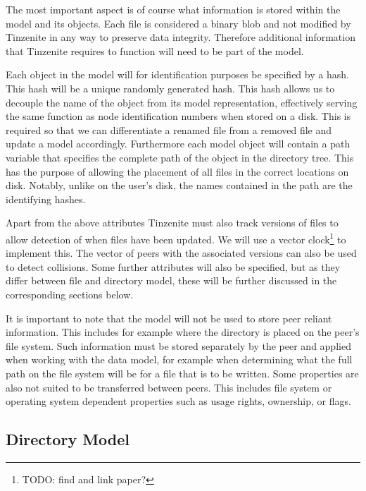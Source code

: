 The most important aspect is of course what information is stored within the model and its objects.
Each file is considered a binary blob and not modified by Tinzenite in any way to preserve data integrity.
Therefore additional information that Tinzenite requires to function will need to be part of the model.

Each object in the model will for identification purposes be specified by a hash.
This hash will be a unique randomly generated hash.
This hash allows us to decouple the name of the object from its model representation, effectively serving the same function as node identification numbers when stored on a disk.
This is required so that we can differentiate a renamed file from a removed file and update a model accordingly.
Furthermore each model object will contain a path variable that specifies the complete path of the object in the directory tree.
This has the purpose of allowing the placement of all files in the correct locations on disk.
Notably, unlike on the user's disk, the names contained in the path are the identifying hashes.

Apart from the above attributes Tinzenite must also track versions of files to allow detection of when files have been updated.
We will use a vector clock\footnote{TODO: find and link paper?} to implement this.
The vector of peers with the associated versions can also be used to detect collisions.
Some further attributes will also be specified, but as they differ between file and directory model, these will be further discussed in the corresponding sections below.

It is important to note that the model will not be used to store peer reliant information.
This includes for example where the directory is placed on the peer's file system.
Such information must be stored separately by the peer and applied when working with the data model, for example when determining what the full path on the file system will be for a file that is to be written.
Some properties are also not suited to be transferred between peers.
This includes file system or operating system dependent properties such as usage rights, ownership, or flags.

\subsection{Directory Model}
\label{sec:dir_model}

